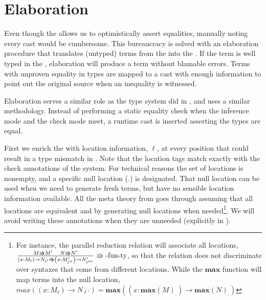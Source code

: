 \section{Elaboration}


Even though the \clang{} allows us to optimistically assert equalities, manually noting every cast would be cumbersome.
This bureaucracy is solved with an elaboration procedure that translates (untyped) terms from the \slang{} into the \clang{}.
If the term is well typed in the \slang{}, elaboration will produce a term without blamable errors.
Terms with unproven equality in types are mapped to a cast with enough information to point out the original source when an inequality is witnessed.
 
Elaboration serves a similar role as the \bidir{} type system did in , and uses a similar methodology.
Instead of performing a static equality check when the inference mode and the check mode meet, a runtime cast is inserted asserting the types are equal.

First we enrich the \slang{} with location information, $\ell$, at every position that could result in a type mismatch in .
Note that the location tags match exactly with the check annotations of the \bidir{} system.
For technical reasons the set of locations is nonempty, and a specific null location ($.$) is designated.
That null location can be used when we need to generate fresh terms, but have no sensible location information available.
All the meta theory from  goes through assuming that all locations are equivalent and by generating null locations when needed\footnote{
For instance, the parallel reduction relation will associate all locations,
$\frac{M\Rrightarrow M'\quad N\Rrightarrow N'}{\left(x:M_{l}\right)\rightarrow N_{l'}\Rrightarrow\left(x:M'_{l''}\right)\rightarrow N'_{l'''}}\,\operatorname{\Rrightarrow-fun-ty}$,
so that the relation does not discriminate over syntaxes that come from different locations.
While the $\textbf{max}$ function will map terms into the null location,
$max\left(\left(x:M_{\ell}\right)\rightarrow N_{\ell'}\right)=\textbf{max}\left(\left(x:\textbf{max}\left(M\right)_{.}\right)\rightarrow \textbf{max}\left(N\right)_{.}\right)$
}.
We will avoid writing these annotations when they are unneeded (explicitly in ).

